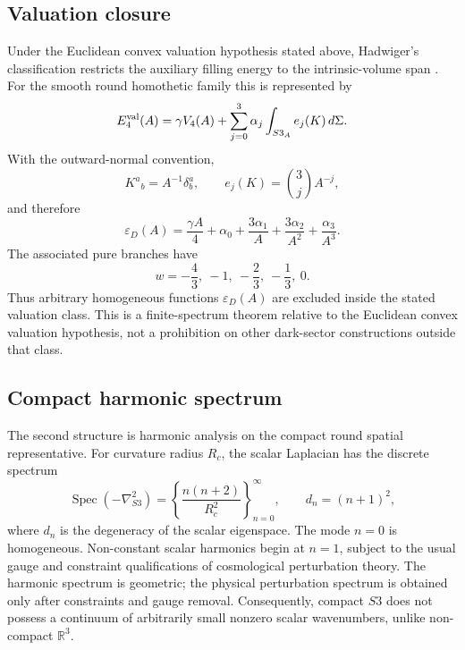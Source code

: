 \documentclass[11pt,a4paper]{article}
\def\Sthree{S3}%
\def\dd{d}%
\numberwithin{equation}{section}
\theoremstyle{definition}
\theoremstyle{plain}
\theoremstyle{remark}
\newcommand{\Sthree}{S^3}
\newcommand{\Efour}{E_4}
\newcommand{\epsD}{\varepsilon_D}
\newcommand{\dd}{\mathrm{d}}
\begin{document}
\subsection{Valuation closure}
Under the Euclidean convex valuation hypothesis stated above, Hadwiger's classification restricts the auxiliary filling energy to the intrinsic-volume span \cite{Hadwiger1957,Schneider2014}. For the smooth round homothetic family this is represented by
\begin{equation}
\Efour^{\rm val}(A)
=\gamma V_4(A)
+\sum_{j=0}^{3}\alpha_j
\int_{\Sthree_A}e_j(K)\,\dd\Sigma .
\end{equation}
With the outward-normal convention,
\begin{equation}
K^a{}_b=A^{-1}\delta^a_b,
\qquad
e_j(K)=\binom{3}{j}A^{-j},
\end{equation}
and therefore
\begin{equation}
\epsD(A)
=\frac{\gamma A}{4}
+\alpha_0
+\frac{3\alpha_1}{A}
+\frac{3\alpha_2}{A^2}
+\frac{\alpha_3}{A^3}.
\end{equation}
The associated pure branches have
\begin{equation}
w=-\frac{4}{3},\ -1,\ -\frac{2}{3},\ -\frac{1}{3},\ 0.
\end{equation}
Thus arbitrary homogeneous functions \(\epsD(A)\) are excluded inside the stated valuation class. This is a finite-spectrum theorem relative to the Euclidean convex valuation hypothesis, not a prohibition on other dark-sector constructions outside that class.

\subsection{Compact harmonic spectrum}
The second structure is harmonic analysis on the compact round spatial representative. For curvature radius \(R_c\), the scalar Laplacian has the discrete spectrum \cite{HalliwellHawking1985,KodamaSasaki1984}
\begin{equation}
\operatorname{Spec}(-\nabla^2_{\Sthree})
=
\left\{
\frac{n(n+2)}{R_c^2}
\right\}_{n=0}^{\infty},
\qquad
d_n=(n+1)^2,
\end{equation}
where \(d_n\) is the degeneracy of the scalar eigenspace. The mode \(n=0\) is homogeneous. Non-constant scalar harmonics begin at \(n=1\), subject to the usual gauge and constraint qualifications of cosmological perturbation theory. The harmonic spectrum is geometric; the physical perturbation spectrum is obtained only after constraints and gauge removal. Consequently, compact \(\Sthree\) does not possess a continuum of arbitrarily small nonzero scalar wavenumbers, unlike non-compact \(\mathbb{R}^3\).
\end{document}
